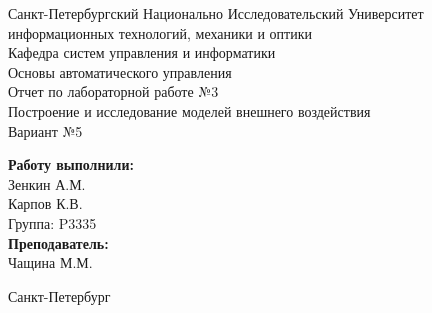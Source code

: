 \begin{titlepage}	%

	\begin{center}		%

		\large Санкт-Петербургский Национально Исследовательский Университет\\
		\large информационных технологий, механики и оптики \\
		\large Кафедра систем управления и информатики\\[6cm]
		
		\huge Основы автоматического управления\\[0.5cm] %
		\large Отчет по лабораторной работе №3\\[0.1cm]
		\large Построение и исследование моделей внешнего воздействия\\[1cm]
		\large Вариант №5\\[5cm]

	\end{center}


	\begin{flushright} %
		\begin{minipage}{0.25\textwidth} %
			\begin{flushleft} %

				\large\textbf{Работу выполнили:}\\
				\large Зенкин А.М.\\
				\large Карпов К.В.\\
				\large {Группа:} P3335\\
				
				\large \textbf{Преподаватель:}\\
				\large Чащина М.М.

			\end{flushleft}
		\end{minipage}
	\end{flushright}
	
	\vfill %

	\begin{center}
	\large Санкт-Петербург\\
	\large \the\year %
	\end{center} %

\thispagestyle{empty} %
\end{titlepage} %

\vfill %
